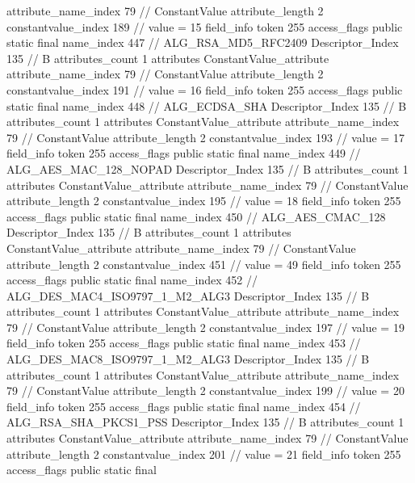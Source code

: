 {{{{{{{					attribute_name_index	79		// ConstantValue
					attribute_length	2
					constantvalue_index	189		// value = 15
				}
				}
			}
			field_info {
				token	255
				access_flags	public static final
				name_index	447		// ALG_RSA_MD5_RFC2409
				Descriptor_Index	135		// B
				attributes_count	1
				attributes {
				ConstantValue_attribute {
					attribute_name_index	79		// ConstantValue
					attribute_length	2
					constantvalue_index	191		// value = 16
				}
				}
			}
			field_info {
				token	255
				access_flags	public static final
				name_index	448		// ALG_ECDSA_SHA
				Descriptor_Index	135		// B
				attributes_count	1
				attributes {
				ConstantValue_attribute {
					attribute_name_index	79		// ConstantValue
					attribute_length	2
					constantvalue_index	193		// value = 17
				}
				}
			}
			field_info {
				token	255
				access_flags	public static final
				name_index	449		// ALG_AES_MAC_128_NOPAD
				Descriptor_Index	135		// B
				attributes_count	1
				attributes {
				ConstantValue_attribute {
					attribute_name_index	79		// ConstantValue
					attribute_length	2
					constantvalue_index	195		// value = 18
				}
				}
			}
			field_info {
				token	255
				access_flags	public static final
				name_index	450		// ALG_AES_CMAC_128
				Descriptor_Index	135		// B
				attributes_count	1
				attributes {
				ConstantValue_attribute {
					attribute_name_index	79		// ConstantValue
					attribute_length	2
					constantvalue_index	451		// value = 49
				}
				}
			}
			field_info {
				token	255
				access_flags	public static final
				name_index	452		// ALG_DES_MAC4_ISO9797_1_M2_ALG3
				Descriptor_Index	135		// B
				attributes_count	1
				attributes {
				ConstantValue_attribute {
					attribute_name_index	79		// ConstantValue
					attribute_length	2
					constantvalue_index	197		// value = 19
				}
				}
			}
			field_info {
				token	255
				access_flags	public static final
				name_index	453		// ALG_DES_MAC8_ISO9797_1_M2_ALG3
				Descriptor_Index	135		// B
				attributes_count	1
				attributes {
				ConstantValue_attribute {
					attribute_name_index	79		// ConstantValue
					attribute_length	2
					constantvalue_index	199		// value = 20
				}
				}
			}
			field_info {
				token	255
				access_flags	public static final
				name_index	454		// ALG_RSA_SHA_PKCS1_PSS
				Descriptor_Index	135		// B
				attributes_count	1
				attributes {
				ConstantValue_attribute {
					attribute_name_index	79		// ConstantValue
					attribute_length	2
					constantvalue_index	201		// value = 21
				}
				}
			}
			field_info {
				token	255
				access_flags	public static final
}}}}}
